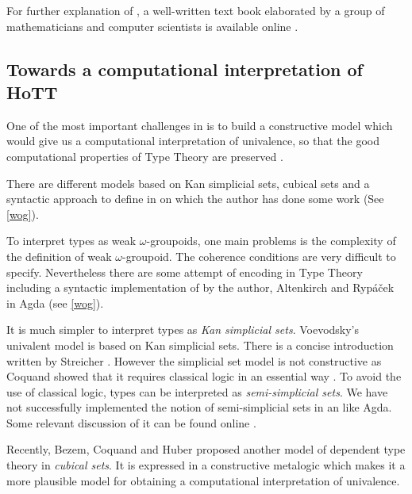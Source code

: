 For further explanation of \hott, a well-written text book elaborated by a group of mathematicians and computer scientists is available online \cite{hott}. 


\subsection{Towards a computational interpretation of HoTT}

One of the most important challenges in \hott is to build a constructive model which would give us a computational interpretation of univalence, so that the good computational properties of Type Theory are preserved \cite{bezem2013model}. 

There are different models based on Kan simplicial sets, cubical sets and a syntactic approach to define \wog in \itt on which the author has done some work (See \autoref{wog}).


To interpret types as weak $\omega$-groupoids, one main problems is
the complexity of the definition of weak $\omega$-groupoid. The
coherence conditions are very difficult to specify. Nevertheless there are some attempt of encoding \wog in Type Theory including a syntactic implementation of \wog by the author, Altenkirch and Ryp\'{a}\v{c}ek
in Agda (see \autoref{wog}).

It is much simpler to interpret types as \emph{Kan simplicial sets}.
Voevodsky's univalent model \cite{klv:ssetmodel} is based on Kan simplicial sets. 
There is a concise introduction written by Streicher \cite{DBLP:dblp_journals/japll/Streicher14}. 
However the simplicial set model is not constructive as Coquand showed
that it requires classical logic in an essential way \cite{TC:sset}.
To avoid the use of classical logic, types can be interpreted as \emph{semi-simplicial sets}. We have not successfully implemented the notion of semi-simplicial sets in an \itt like Agda. Some relevant discussion of it can be found online \cite{ssSet}.

Recently, Bezem, Coquand and Huber \cite{bezem2013model} proposed another model of dependent type theory 
in \emph{cubical sets}. It is expressed in a constructive metalogic which makes it a more plausible model for obtaining a computational interpretation of univalence.


